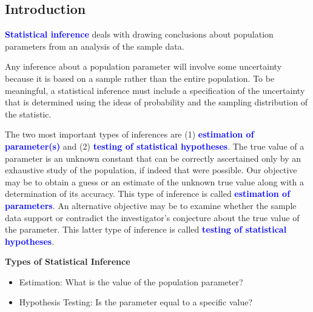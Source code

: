 \documentclass[12pt,openany]{book}
\theoremstyle{definition}
\begin{document}
	\subsection{Introduction}
	\begin{tcolorbox}[colback=white]
		\textcolor{blue}{\bf Statistical inference} deals with drawing conclusions about population
		parameters from an analysis of the sample data.
	\end{tcolorbox}
	Any inference about a population parameter will involve some uncertainty because it is based on a sample rather than the entire population. To be meaningful, a statistical inference must include a specification of the uncertainty that is determined using the ideas of probability and the sampling distribution of the statistic.
	\par
	The two most important types of inferences are (1) \textcolor{blue}{\bf estimation of
		parameter(s)} and (2) \textcolor{blue}{\bf testing of statistical hypotheses}. The true value of a parameter is an unknown constant that can be correctly ascertained only by an exhaustive study of the population, if indeed that were possible. Our objective may be to obtain a guess or an estimate of the unknown true value along with a
	determination of its accuracy. This type of inference is called \textcolor{blue}{\bf estimation of parameters}. An alternative objective may be to examine whether the sample data support or contradict the investigator’s conjecture about the true value of the parameter. This latter type of inference is called 
	\textcolor{blue}{\bf testing of statistical hypotheses}.\\
	
	\begin{tcolorbox}[colback=white]\begin{center}
			\bf Types of Statistical Inference
		\end{center}\begin{itemize}\bf
			\item Estimation: What is the value of the population parameter?
			\item Hypothesis Testing: Is the parameter equal to a specific value?
		\end{itemize}
	\end{tcolorbox}
	
\end{document}
